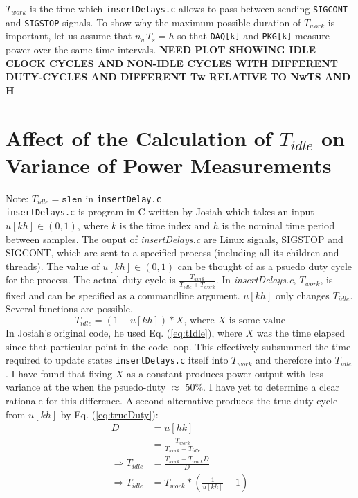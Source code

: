 \documentclass{article}
\newcommand{\mref}[1]{Eq. (\ref{#1})}
\begin{document}
$T_{work}$ is the time which \texttt{insertDelays.c} allows to pass between sending \texttt{SIGCONT} and \texttt{SIGSTOP} signals.  To show why the maximum possible duration of $T_{work}$ is important, let us assume that $n_wT_s=h$ so that \texttt{DAQ[k]} and \texttt{PKG[k]} measure power over the same time intervals.  \textbf{NEED PLOT SHOWING IDLE CLOCK CYCLES AND NON-IDLE CYCLES WITH DIFFERENT DUTY-CYCLES AND DIFFERENT Tw RELATIVE TO NwTS AND H}

\section{Affect of the Calculation of $T_{idle}$ on Variance of Power Measurements}
Note: $T_{idle}=\texttt{slen}$ in \texttt{insertDelay.c} \\
\texttt{insertDelays.c} is program in C written by Josiah which takes an input $u[kh] \in (0, 1)$, where $k$ is the time index and $h$ is the nominal time period between samples.  The ouput of \emph{insertDelays.c} are Linux signals, SIGSTOP and SIGCONT, which are sent to a specified process (including all its children and threads). The value of $u[kh] \in (0, 1)$ can be thought of as a psuedo duty cycle for the process.  The actual duty cycle is $\frac{T_{work}}{T_{idle}+T_{work}}$. In \emph{insertDelays.c}, $T_{work}$, is fixed and can be specified as a commandline argument.  $u[kh]$ only changes $T_{idle}$.  Several functions are possible.  
\begin{equation} \label{eq:tIdle} T_{idle}=(1-u[kh])*X\text{, where $X$ is some value} \end{equation}
In Josiah's original code, he used \mref{eq:tIdle}, where $X$ was the time elapsed since that particular point in the code loop. This effectively subsummed the time required to update states \texttt{insertDelays.c} itself into $T_{work}$ and therefore into $T_{idle}$.  I have found that fixing $X$ as a constant produces power output with less variance at the when the psuedo-duty $\approx$ 50\%.  I have yet to determine a clear rationale for this difference. A second alternative produces the true duty cycle from $u[kh]$ by \mref{eq:trueDuty}:
\begin{equation}  
	\begin{aligned} 
		D&=u[hk] \\
		 &=\frac{T_{work}}{T_{work}+T_{idle}} \\ 
		\Rightarrow T_{idle}&=\frac{T_{work}-T_{work}D}{D} \\
		\Rightarrow T_{idle}&=T_{work}*(\frac{1}{u[kh]}-1) 
	\end{aligned} 
	\label{eq:trueDuty}
\end{equation}
\end{document}
